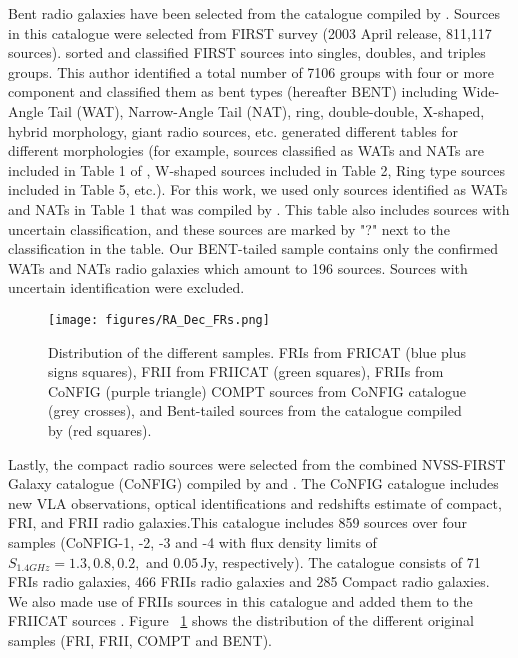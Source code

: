 \documentclass[fleqn,usenatbib]{mnras}
\begin{document}
Bent radio galaxies have been selected from the catalogue compiled by \citet{Proctor2011}. Sources in this catalogue were selected from FIRST survey (2003 April release, 811,117 sources). \citet{Proctor2011} sorted and classified FIRST sources into singles, doubles, and triples groups. This author identified a total number of 7106 groups with four or more component and classified them as bent types (hereafter BENT) including Wide-Angle Tail (WAT), Narrow-Angle Tail (NAT), ring, double-double, X-shaped, hybrid morphology, giant radio sources, etc. \citet{Proctor2011} generated different tables for different morphologies (for example, sources classified as WATs and NATs are included in Table 1 of \citet{Proctor2011}, W-shaped sources included in Table 2, Ring type sources included in Table 5, etc.). For this work, we used only sources identified as WATs and NATs in Table 1 that was compiled by \citet{Proctor2011}. This table also includes sources with uncertain classification, and these sources are marked by "?" next to the classification in the table. Our BENT-tailed sample contains only the confirmed WATs and NATs radio galaxies which amount to 196 sources. Sources with uncertain identification were excluded.
\begin{figure}
    \centering
    \texttt{[image: figures/RA\_Dec\_FRs.png]}
    \caption{Distribution of the different samples. FRIs from FRICAT (blue plus signs squares), FRII from FRIICAT (green squares), FRIIs from CoNFIG (purple triangle) COMPT sources from CoNFIG catalogue (grey crosses), and Bent-tailed sources from the catalogue compiled by \citet{Proctor2011} (red squares).}
    \label{fig:Map_dat}
\end{figure}

Lastly, the compact radio sources were selected from the combined NVSS-FIRST Galaxy catalogue (CoNFIG) compiled by \citet{Gendre2008} and \citet{Gendre2010}. The CoNFIG catalogue includes new VLA observations, optical identifications and redshifts estimate of compact, FRI, and FRII radio galaxies.This catalogue includes 859 sources over four samples (CoNFIG-1, -2, -3 and -4 with flux density limits of $ S_{1.4 GHz} = 1.3, 0.8, 0.2,$ and $0.05\,$Jy, respectively). The catalogue consists of 71 FRIs radio galaxies, 466 FRIIs radio galaxies and 285 Compact radio galaxies.  We also made use of FRIIs sources in this catalogue and added them to the FRIICAT sources \cite[compiled by ][]{Capetti2017b}. Figure ~\ref{fig:Map_dat} shows the distribution of the different original samples (FRI, FRII, COMPT and BENT).
\end{document}
